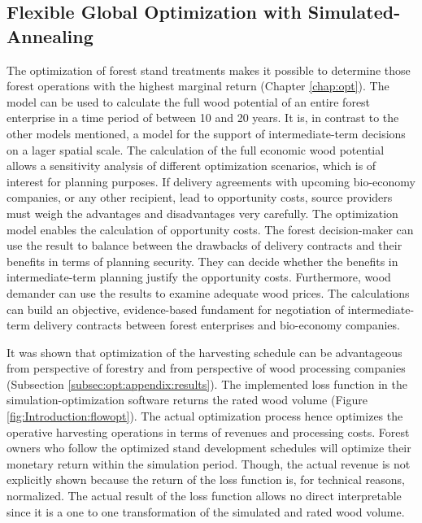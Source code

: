 \subsection{Flexible Global Optimization with Simulated-Annealing}
\label{subsec:discussion:struct:opt}
The optimization of forest stand treatments makes it possible to determine those forest operations with the highest marginal return (Chapter \ref{chap:opt}). The model can be used to calculate the full wood potential of an entire forest enterprise in a time period of between 10 and 20 years. It is, in contrast to the other models mentioned, a model for the support of intermediate-term decisions on a lager spatial scale. The calculation of the full economic wood potential allows a sensitivity analysis of different optimization scenarios, which is of interest for planning purposes. If delivery agreements with upcoming bio-economy companies, or any other recipient, lead to opportunity costs, source providers must weigh the advantages and disadvantages very carefully. The optimization model enables the calculation of opportunity costs. The forest decision-maker can use the result to balance between the drawbacks of delivery contracts and their benefits in terms of planning security. They can decide whether the benefits in intermediate-term planning justify the opportunity costs. Furthermore, wood demander can use the results to examine adequate wood prices. The calculations can build an objective, evidence-based fundament for negotiation of intermediate-term delivery contracts between forest enterprises and bio-economy companies.

It was shown that optimization of the harvesting schedule can be advantageous from perspective of forestry and from perspective of wood processing companies (Subsection \ref{subsec:opt:appendix:results}). The implemented loss function in the simulation-optimization software returns the rated wood volume (Figure \ref{fig:Introduction:flowopt}). The actual optimization process hence optimizes the operative harvesting operations in terms of revenues and processing costs. Forest owners who follow the optimized stand development schedules will optimize their monetary return within the simulation period. Though, the actual revenue is not explicitly shown because the return of the loss function is, for technical reasons, normalized. The actual result of the loss function allows no direct interpretable since it is a one to one transformation of the simulated and rated wood volume.

